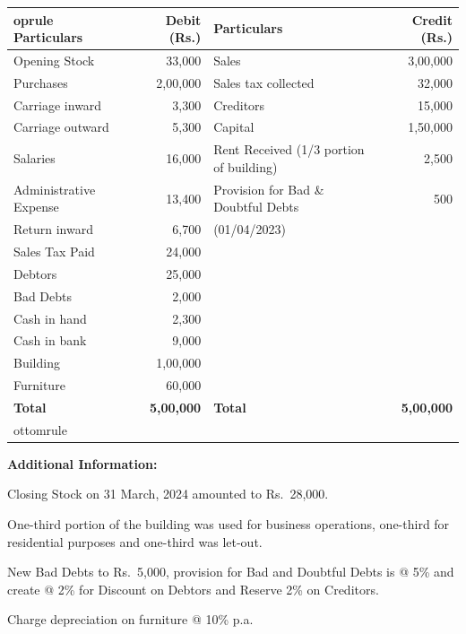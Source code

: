 \documentclass[11pt,a4paper]{article}
\begin{document}
\begin{center}\small
  
\begin{tabular}{lr|lr}
     oprule
   \textbf{Particulars} &   \textbf{Debit (Rs.)} &   \textbf{Particulars} &   \textbf{Credit (Rs.)} \\
    \midrule
    Opening Stock & 33,000 & Sales & 3,00,000 \\
    Purchases & 2,00,000 & Sales tax collected & 32,000 \\
    Carriage inward & 3,300 & Creditors & 15,000 \\
    Carriage outward & 5,300 & Capital & 1,50,000 \\
    Salaries & 16,000 & Rent Received (1/3 portion of building) & 2,500 \\
    Administrative Expense & 13,400 & Provision for Bad \& Doubtful Debts & 500 \\
    Return inward & 6,700 & \quad (01/04/2023) & \\
    Sales Tax Paid & 24,000 & & \\
    Debtors & 25,000 & & \\
    Bad Debts & 2,000 & & \\
    Cash in hand & 2,300 & & \\
    Cash in bank & 9,000 & & \\
    Building & 1,00,000 & & \\
    Furniture & 60,000 & & \\
    \midrule
   \textbf{Total} &   \textbf{5,00,000} &   \textbf{Total} &   \textbf{5,00,000} \\
    ottomrule
  \end{tabular}
\end{center}




\noindent   \textbf{Additional Information:}

\begin{parts}
  \item Closing Stock on 31 March, 2024 amounted to Rs.\ 28,000.
  \item One-third portion of the building was used for business operations, one-third for residential purposes and one-third was let-out.
  \item New Bad Debts to Rs.\ 5,000, provision for Bad and Doubtful Debts is @ 5\% and create @ 2\% for Discount on Debtors and Reserve 2\% on Creditors.
  \item Charge depreciation on furniture @ 10\% p.a.
\end{parts}
\end{document}
